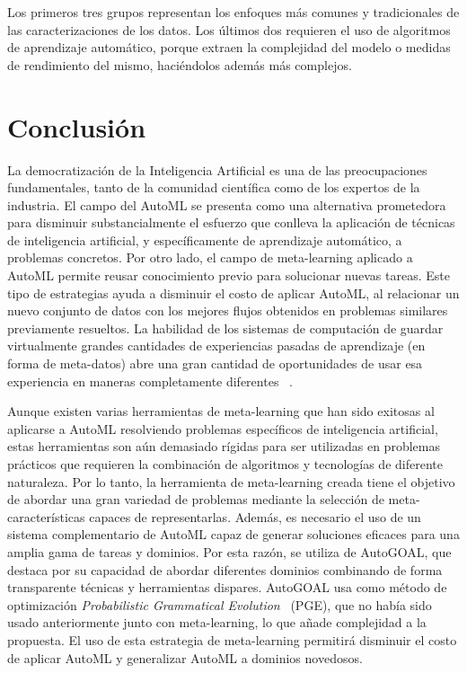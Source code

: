 Los primeros tres grupos representan los enfoques más comunes y tradicionales
de las caracterizaciones de los datos. Los últimos dos requieren el uso de
algoritmos de aprendizaje automático, porque extraen la complejidad del modelo
o medidas de rendimiento del mismo, haciéndolos además más complejos.

\section{Conclusión}\label{sec:conclusion}

La democratización de la Inteligencia Artificial es una de las preocupaciones
fundamentales, tanto de la comunidad científica como de los expertos de la
industria. El campo del AutoML se presenta como una alternativa prometedora
para disminuir substancialmente el esfuerzo que conlleva la aplicación de
técnicas de inteligencia artificial, y específicamente de aprendizaje
automático, a problemas concretos. Por otro lado, el campo de meta-learning
aplicado a AutoML permite reusar conocimiento previo para solucionar nuevas
tareas. Este tipo de estrategias ayuda a disminuir el costo de aplicar AutoML,
al relacionar un nuevo conjunto de datos con los mejores flujos obtenidos en
problemas similares previamente resueltos. La habilidad de los sistemas de
computación de guardar virtualmente grandes cantidades de experiencias pasadas
de aprendizaje (en forma de meta-datos) abre una gran cantidad de oportunidades
de usar esa experiencia en maneras completamente diferentes
~\cite{vanschoren2018metalearning}.

Aunque existen varias herramientas de meta-learning que han sido exitosas al
aplicarse a AutoML resolviendo problemas específicos de inteligencia
artificial, estas herramientas son aún demasiado rígidas para ser utilizadas
en problemas prácticos que requieren la combinación de algoritmos y tecnologías
de diferente naturaleza. Por lo tanto, la herramienta de meta-learning creada
tiene el objetivo de abordar una gran variedad de problemas mediante la
selección de meta-características capaces de representarlas. Además, es
necesario el uso de un sistema complementario de AutoML capaz de generar
soluciones eficaces para una amplia gama de tareas y dominios. Por esta razón,
se utiliza de AutoGOAL, que destaca por su
capacidad de abordar diferentes dominios combinando de forma transparente
técnicas y herramientas dispares. AutoGOAL usa como método de optimización
\textit{Probabilistic Grammatical Evolution}~\cite{estevez2021general} (PGE),
que no había sido usado anteriormente junto con meta-learning, lo que añade
complejidad a la propuesta. El uso de esta estrategia de meta-learning
permitirá disminuir el costo de aplicar AutoML y generalizar AutoML a dominios
novedosos.
